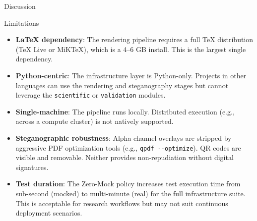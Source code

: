 \documentclass[
  ignorenonframetext,
]{beamer}
\providecommand{\tightlist}{%
  \setlength{\itemsep}{0pt}\setlength{\parskip}{0pt}}
\begin{document}
\begin{frame}[fragile]{Discussion}
\begin{block}{Limitations}
\protect{}\label{limitations}
\begin{itemize}
\tightlist
\item
  \textbf{LaTeX dependency}: The rendering pipeline requires a full TeX
  distribution (TeX Live or MiKTeX), which is a 4--6 GB install. This is
  the largest single dependency.
\item
  \textbf{Python-centric}: The infrastructure layer is Python-only.
  Projects in other languages can use the rendering and steganography
  stages but cannot leverage the \texttt{scientific} or
  \texttt{validation} modules.
\item
  \textbf{Single-machine}: The pipeline runs locally. Distributed
  execution (e.g., across a compute cluster) is not natively supported.
\item
  \textbf{Steganographic robustness}: Alpha-channel overlays are
  stripped by aggressive PDF optimization tools (e.g.,
  \texttt{qpdf\ -\/-optimize}). QR codes are visible and removable.
  Neither provides non-repudiation without digital signatures.
\item
  \textbf{Test duration}: The Zero-Mock policy increases test execution
  time from sub-second (mocked) to multi-minute (real) for the full
  infrastructure suite. This is acceptable for research workflows but
  may not suit continuous deployment scenarios.
\end{itemize}
\end{block}


\end{frame}
\end{document}
